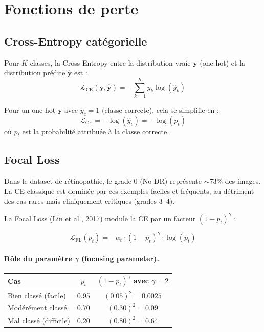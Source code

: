 \documentclass[11pt,a4paper]{article}
\begin{document}
\section{Fonctions de perte}

\subsection{Cross-Entropy catégorielle}

Pour $K$ classes, la Cross-Entropy entre la distribution vraie $\mathbf{y}$ (one-hot) et la distribution prédite $\hat{\mathbf{y}}$ est :
\begin{equation}
  \mathcal{L}_{\text{CE}}(\mathbf{y}, \hat{\mathbf{y}}) = -\sum_{k=1}^{K} y_k \log(\hat{y}_k)
\end{equation}

Pour un one-hot $\mathbf{y}$ avec $y_c = 1$ (classe correcte), cela se simplifie en :
\begin{equation}
  \mathcal{L}_{\text{CE}} = -\log(\hat{y}_c) = -\log(p_t)
\end{equation}
où $p_t$ est la probabilité attribuée à la classe correcte.

\subsection{Focal Loss}

\begin{defbox}
Dans le dataset de rétinopathie, le grade 0 (No DR) représente $\sim$73\% des images. La CE classique est dominée par ces exemples faciles et fréquents, au détriment des cas rares mais cliniquement critiques (grades 3--4).
\end{defbox}

La Focal Loss (Lin et al., 2017) module la CE par un facteur $(1 - p_t)^\gamma$ :

\begin{equation}
  \boxed{\mathcal{L}_{\text{FL}}(p_t) = -\alpha_t \cdot (1 - p_t)^\gamma \cdot \log(p_t)}
\end{equation}

\paragraph{Rôle du paramètre $\gamma$ (focusing parameter).}

\begin{center}
\begin{tabular}{lcc}
\toprule
\textbf{Cas} & \textbf{$p_t$} & \textbf{$(1-p_t)^\gamma$ avec $\gamma=2$} \\
\midrule
Bien classé (facile) & 0.95 & $(0.05)^2 = 0.0025$ \\
Modérément classé & 0.70 & $(0.30)^2 = 0.09$ \\
Mal classé (difficile) & 0.20 & $(0.80)^2 = 0.64$ \\
\bottomrule
\end{tabular}
\end{center}
\end{document}
